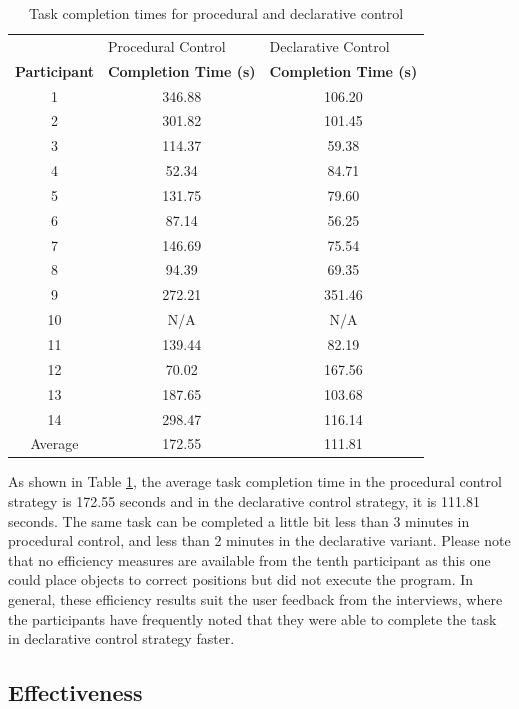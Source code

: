 \documentclass[10pt, conference]{IEEEtran}
\begin{document}
\begin{table}[h!]
\centering
\begin{tabular}{c c c}
 & \multicolumn{1}{l}{Procedural Control} & \multicolumn{1}{l}{Declarative Control} \\
\textbf{Participant} & \multicolumn{1}{l}{\textbf{Completion Time (s)}} & \multicolumn{1}{l}{\textbf{Completion Time (s)}} \\
\hline
1 & 346.88 & 106.20 \\
2 & 301.82 & 101.45 \\
3 & 114.37 & 59.38 \\
4 & 52.34 & 84.71 \\
5 & 131.75 & 79.60 \\
6 & 87.14 & 56.25 \\
7 & 146.69 & 75.54 \\
8 & 94.39 & 69.35 \\
9 & 272.21 & 351.46 \\
10 & N/A & N/A \\
11 & 139.44 & 82.19 \\
12 & 70.02 & 167.56 \\
13 & 187.65 & 103.68 \\
14 & 298.47 & 116.14 \\
\hline
Average & 172.55 & 111.81\\
\hline
\end{tabular}
\caption{Task completion times for procedural and declarative control}
\label{completion_times}
\end{table}

As shown in Table \ref{completion_times}, the average task completion time in the procedural control strategy is 172.55 seconds and in the declarative control strategy, it is 111.81 seconds. The same task can be completed a little bit less than 3 minutes in procedural control, and less than 2 minutes in the declarative variant. Please note that no efficiency measures are available from the tenth participant as this one could place objects to correct positions but did not execute the program. In general, these efficiency results suit the user feedback from the interviews, where the participants have frequently noted that they were able to complete the task in declarative control strategy faster.


\subsection{Effectiveness}
\label{evalEffectiveness}
\end{document}
